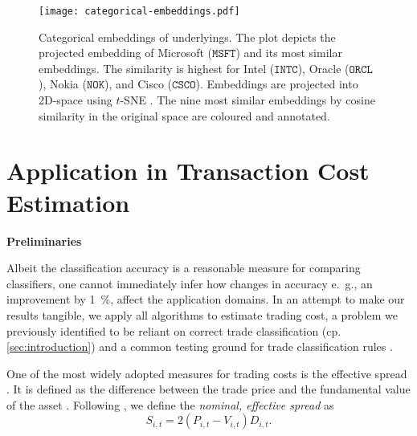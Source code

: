 \begin{figure}[ht]
    \centering
    \texttt{[image: categorical-embeddings.pdf]}
    \caption[Categorical Embeddings of Underlyings]{Categorical embeddings of underlyings. The plot depicts the projected embedding of Microsoft ($\mathtt{MSFT}$) and its most similar embeddings. The similarity is highest for Intel ($\mathtt{INTC}$), Oracle ($\mathtt{ORCL}$), Nokia ($\mathtt{NOK}$), and Cisco ($\mathtt{CSCO}$). Embeddings are projected into 2D-space using $t$-SNE \autocite{vandermaatenVisualizingDataUsing2008}. The nine most similar embeddings by cosine similarity in the original space are coloured and annotated.}
    \label{fig:categorical-embeddings}
\end{figure}




\newpage
\section{Application in Transaction Cost Estimation}\label{sec:application}

\textbf{Preliminaries}


Albeit the classification accuracy is a reasonable measure for comparing classifiers, one cannot immediately infer how changes in accuracy e.~g., an improvement by \SI{1}{\percent}, affect the application domains. In an attempt to make our results tangible, we apply all algorithms to estimate trading cost, a problem we previously identified to be reliant on correct trade classification (cp. \cref{sec:introduction}) and a common testing ground for trade classification rules \autocites[cp.][541]{ellisAccuracyTradeClassification2000}[][569]{finucaneDirectTestMethods2000}[][271--278]{petersonEvaluationBiasesExecution2003}[][896--897]{savickasInferringDirectionOption2003}.

One of the most widely adopted measures for trading costs is the effective spread \autocite[][112]{Piwowar_2006}. It is defined as the difference between the trade price and the fundamental value of the asset \autocite[][238--239]{bessembinderIssuesAssessingTrade2003}. Following \textcite[][238--239]{bessembinderIssuesAssessingTrade2003}, we define the \emph{nominal, effective spread} as
\begin{equation}
    S_{i,t} = 2 (P_{i,t} - V_{i,t}) D_{i,t}.
    \label{eq:effective-spread}
\end{equation}

